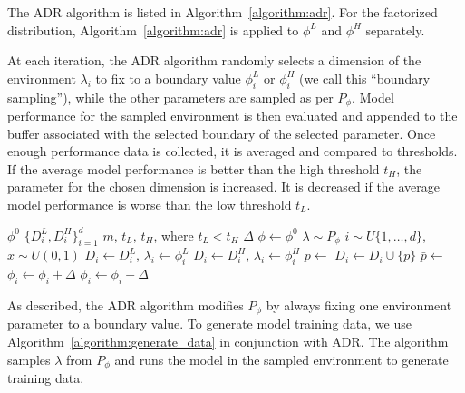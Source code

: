 The ADR algorithm is listed in Algorithm~\ref{algorithm:adr}. For the factorized distribution, Algorithm~\ref{algorithm:adr} is applied to $\phi^L$ and $\phi^H$ separately.

At each iteration, the ADR algorithm randomly selects a dimension of the environment $\lambda_i$ to fix to a boundary value $\phi^L_i$ or $\phi^H_i$ (we call this ``boundary sampling''), while the other parameters are sampled as per $P_{\phi}$. Model performance for the sampled environment is then evaluated and appended to the buffer associated with the selected boundary of the selected parameter. Once enough performance data is collected, it is averaged and compared to thresholds. If the average model performance is better than the high threshold $t_H$, the parameter for the chosen dimension is increased. It is decreased if the average model performance is worse than the low threshold $t_L$.

\begin{algorithm}
\caption{ADR}\label{algorithm:adr}
\begin{algorithmic}
\Require $\phi^{0}$ 
\Require $\{D^L_i, D^H_i\}_{i=1}^d$ 
\Require $m$, $t_L$, $t_H$, where $t_L < t_H$ 
\Require $\Delta$ 
\State $\phi \leftarrow \phi^{0}$
\Repeat
    \State $\lambda \sim P_{\phi}$
    \State $i \sim U\{1, \dots, d\}$, $x \sim U(0, 1)$
        \State $D_i \gets D^L_i$, $\lambda_i \gets \phi^L_i$ 
    \Else{}
        \State $D_i \gets D^H_i$, $\lambda_i \gets \phi^H_i$ 
    \EndIf
    \State $p \gets$   
    \State $D_i \gets D_i \cup \{p\}$  
        \State $\bar{p} \gets$ 
        \State {}
            \State $\phi_i \gets \phi_i + \Delta$
            \State $\phi_i \gets \phi_i - \Delta$
        \EndIf
    \EndIf
{}
\end{algorithmic}
\end{algorithm}


As described, the ADR algorithm modifies $P_{\phi}$ by always fixing one environment parameter to a boundary value. To generate model training data, we use Algorithm~\ref{algorithm:generate_data} in conjunction with ADR. The algorithm samples $\lambda$ from $P_{\phi}$ and runs the model in the sampled environment to generate training data.

